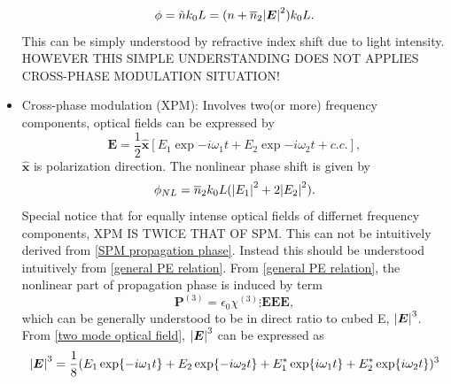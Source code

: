 \documentclass[12pt]{extarticle}
\numberwithin{equation}{section}
\numberwithin{figure}{section}
\numberwithin{table}{section}
\newcommand{\<}{\langle}
\renewcommand{\>}{\rangle}
\theoremstyle{definition}
\begin{document}
\begin{itemize}
                    \begin{equation}
                        \phi = \Tilde{n}k_0 L = (n+\overline{n}_2\abs{\boldsymbol{E}}^2)k_0 L .
                        \label{SPM propagation phase}
                    \end{equation}
                    This can be simply understood by refractive index shift due to light intensity. \MakeUppercase{However this simple understanding does not applies Cross-phase modulation situation!}
                \item Cross-phase modulation (XPM): Involves two(or more) frequency components, optical fields can be expressed by
                    \begin{equation}
                        \boldsymbol{E} = \frac{1}{2} \boldsymbol{\hat{x}}[E_1\exp{-i\omega_1t} + E_2\exp{-i\omega_2 t} + c.c.] ,
                        \label{two mode optical field}
                    \end{equation}
                    $\boldsymbol{\hat{x}}$ is polarization direction. The nonlinear phase shift is given by
                    \begin{equation}
                        \phi_{NL} = \overline{n}_2 k_0 L(\abs{E_1}^2+2\abs{E_2}^2).
                        \label{cross phase modulation NL phase shift}
                    \end{equation}
                Special notice that for equally intense optical fields of differnet frequency components, \MakeUppercase{XPM is twice that of SPM}. This can not be intuitively derived from \autoref{SPM propagation phase}. Instead this should be understood intuitively from \autoref{general PE relation}. From \autoref{general PE relation}, the nonlinear part of propagation phase is induced by term
                \begin{equation}
                    \boldsymbol{P}^{(3)} = \epsilon_0 \chi^{(3)} \vdots \boldsymbol{EEE},
                \end{equation}
                which can be generally understood to be in direct ratio to cubed E, $\abs{\boldsymbol{E}}^3$. From \autoref{two mode optical field}, $\abs{\boldsymbol{E}}^3$ can be expressed as
                \begin{equation}
                    \begin{split}
                        \abs{\boldsymbol{E}}^3 &= \frac{1}{8}(E_1\exp{-i\omega_1 t} + E_2\exp{-i\omega_2 t} + E_1^*\exp{i\omega_1 t} + E_2^*\exp{i\omega_2 t})^3\\&

\end{split}
\end{equation}
\end{itemize}
\end{document}
